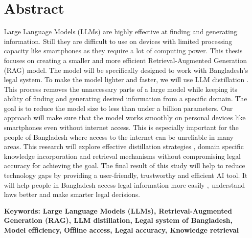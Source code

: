 \section*{Abstract}
Large Language Models (LLMs) are highly effective at  finding and generating information. Still they are difficult to use on devices with limited processing capacity like smartphones as they require a lot of computing power. This thesis focuses on creating a smaller and more efficient Retrieval-Augmented Generation (RAG) model. The model will be specifically designed to work with Bangladesh’s legal system. To make the model lighter and faster, we will use LLM distillation . This process removes the unnecessary parts of a large model while keeping its ability of finding and generating desired information from a specific domain. The goal is to reduce the model size to less than under a billion parameters. Our approach will make sure that the model works smoothly on personal devices like smartphones even without internet access. This is especially important for the people of Bangladesh where access to the internet can be unreliable in many areas. This research will explore effective distillation strategies , domain specific knowledge incorporation and retrieval mechanisms without compromising legal accuracy for achieving the goal. The final result of this study will help to reduce technology gaps by providing a user-friendly, trustworthy and efficient AI tool. It will help people in Bangladesh access legal information more easily , understand laws better and make smarter legal decisions.

\vspace{1cm}
\textbf{Keywords: Large Language Models (LLMs), Retrieval-Augmented Generation (RAG), LLM distillation, Legal system of Bangladesh, Model efficiency, Offline access, Legal accuracy, Knowledge retrieval} 
\pagebreak
